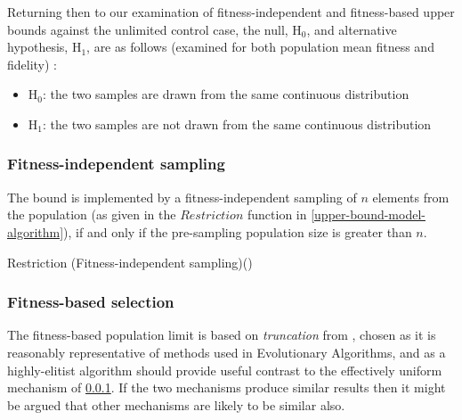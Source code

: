 Returning then to our examination of fitness-independent and fitness-based upper bounds against the unlimited control case, the null, H$_0$, and alternative hypothesis, H$_1$, are as follows (examined for both population mean fitness and fidelity) :

\begin{itemize}[label={}]
	\item H$_0$: the two samples are drawn from the same continuous distribution
	\item H$_1$: the two samples are not drawn from the same continuous distribution
\end{itemize}

\subsubsection{Fitness-independent sampling}\label{fitness-independent-sampling}

The bound is implemented by a fitness-independent sampling of $n$ elements from the population (as given in the $Restriction$ function in \autoref{upper-bound-model-algorithm}), if and only if the pre-sampling population size is greater than $n$.

\begin{function}
	\caption{Restriction (Fitness-independent sampling)()}
\end{function}


\subsubsection{Fitness-based selection}

The fitness-based population limit is based on \emph{truncation} from \cite[124]{DeJong2006}, chosen as it is reasonably representative of methods used in Evolutionary Algorithms, and as a highly-elitist algorithm should provide useful contrast to the effectively uniform mechanism of \cref{fitness-independent-sampling}. If the two mechanisms produce similar results then it might be argued that other mechanisms are likely to be similar also.

